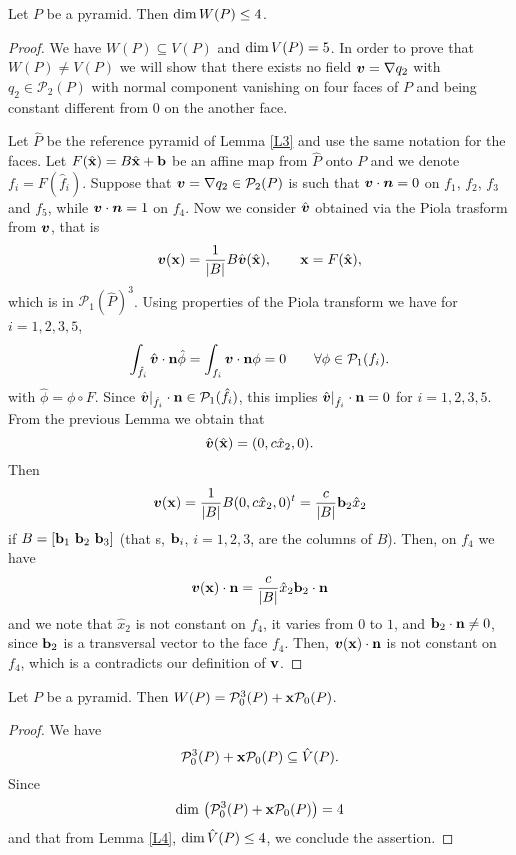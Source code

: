 \begin{lemma}\label{L4}
Let $P$ be a pyramid. Then $\mbox{dim\,}W(P)\le4$.
\end{lemma}
\begin{proof}
We have $W(P)\subseteq V(P)$ and $\mbox{dim\,}V(P)=5$. In order to prove that $W(P)\ne
V(P)$ we will show that there exists no field
$\boldsymbol{v}=\nabla q_2$ with $q_2\in \mathcal P_2(P)$ with normal
component vanishing on four faces of $P$ and being constant different from $0$ on
the another face.

Let $\hat P$ be the reference pyramid of Lemma \ref{L3} and
use the same notation for the faces. Let $F(\hat {\bf x})=B\hat
{\bf x} + {\bf b}$ be an affine map from $\hat P$ onto $P$ and we denote
$f_i=F(\hat f_i)$. Suppose
that $\boldsymbol{v}=\nabla q_2\in \mathcal P_2(P)$ is such that
$\boldsymbol{v}\cdot\boldsymbol{n}=0$ on $f_1$, $f_2$, $f_3$ and $f_5$, while
$\boldsymbol{v}\cdot\boldsymbol{n}=1$ on $f_4$. Now we consider $\hat{\boldsymbol{v}}$
obtained via the Piola trasform from $\boldsymbol{v}$, that is
\begin{equation}\label{piola}
\boldsymbol{v}({\bf x}) = \frac1{|B|}B\hat{\boldsymbol{v}}(\hat{\bf x}), \qquad {\bf x}=F(\hat {\bf x}),
\end{equation}
which is in $\mathcal P_1(\hat P)^3$. Using properties of the Piola transform \cite[pages 12--14]{BBDDFF} we have for $i=1,2,3,5$,
\[
\int_{\hat f_i}\hat {\boldsymbol{v}}\cdot {\bf n}\hat\phi = \int_{f_i}\boldsymbol{v}\cdot {\bf n}\phi =0\qquad \forall \phi\in\mathcal P_1(f_i).
\]
with $\hat \phi = \phi\circ F$. Since $\hat{\boldsymbol{v}}|_{\hat f_i}\cdot {\bf n}\in\mathcal P_1(\hat f_i)$, this implies $\hat{\boldsymbol{v}}|_{\hat f_i}\cdot {\bf n}=0$ for $i=1,2,3,5$. From the previous Lemma we obtain that
\[
\hat{\boldsymbol{v}}(\hat{\bf x})=(0,c\hat x_2,0).
\]
Then
\[
\boldsymbol{v}({\bf x})=\frac1{|B|}B(0,c\hat x_2,0)^t = \frac c{|B|}{\bf b}_2 \hat x_2
\]
if $B=[{\bf b}_1\,\,{\bf b}_2\,\,{\bf b}_3]$ (that s, ${\bf b}_i$, $i=1,2,3$,  are the columns of $B$). Then, on $f_4$ we have 
\[
\boldsymbol{v}({\bf x})\cdot {\bf n}=\frac c{|B|}\hat x_2{\bf b}_2\cdot {\bf n} 
\]
and we note that $\hat x_2$ is not constant on $f_4$, it varies from $0$ to $1$, and ${\bf b}_2\cdot {\bf n}\ne 0$, since ${\bf b}_2$ is a transversal vector to the face $f_4$. Then, $\boldsymbol{v}({\bf x})\cdot {\bf n}$ is not constant on $f_4$, which is a contradicts our definition of $\bf v$.  
\end{proof}

\begin{proposition}
Let $P$ be a pyramid. Then $W(P)=\mathcal
P_0^3(P)+{\bf x}\mathcal P_0(P)$.
\end{proposition}
\begin{proof}
We have
\[
\mathcal P_0^3(P)+{\bf x}\mathcal P_0(P)\subseteq \hat
V(P).
\]
Since
\[
\mbox{dim\,}\left(\mathcal P_0^3(P)+{\bf x}\mathcal
P_0(P)\right)=4
\]
and that from Lemma \ref{L4}, $\mbox{dim\,}\hat
V(P)\le4$, we conclude the assertion.
\end{proof}

